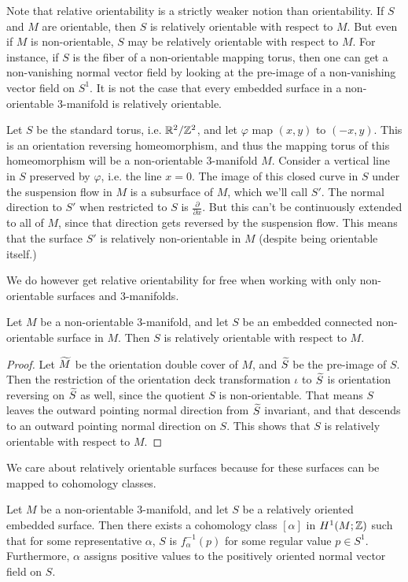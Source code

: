 Note that relative orientability is a strictly weaker notion than orientability. If $S$ and $M$ are
orientable, then $S$ is relatively orientable with respect to $M$. But even if $M$ is
non-orientable, $S$ may be relatively orientable with respect to $M$. For instance, if $S$ is
the fiber of a non-orientable mapping torus, then one can get a non-vanishing normal vector field
by looking at the pre-image of a non-vanishing vector field on $S^1$.
It is not the case that every embedded surface in a non-orientable $3$-manifold is relatively orientable.
\begin{example}
  Let $S$ be the standard torus, i.e. $\mathbb{R}^2/\mathbb{Z}^2$, and let $\varphi$ map $(x,y)$ to $(-x, y)$. This is an
  orientation reversing homeomorphism, and thus the mapping torus of this homeomorphism will be a
  non-orientable $3$-manifold $M$. Consider a vertical line in $S$ preserved by $\varphi$, i.e. the line
  $x = 0$. The image of this closed curve in $S$ under the suspension flow in $M$ is a subsurface of $M$,
  which we'll call $S'$. The normal direction to $S'$ when restricted to $S$ is $\frac{\partial}{\partial x}$. But
  this can't be continuously extended to all of $M$, since that direction gets reversed by the suspension flow.
  This means that the surface $S'$ is relatively non-orientable in $M$ (despite being orientable itself.)
\end{example}
We do however get relative orientability for free when working with only non-orientable surfaces and $3$-manifolds.
\begin{prop}
  \label{prop:relative-orientability}
  Let $M$ be a non-orientable $3$-manifold, and let $S$ be an embedded connected non-orientable surface in $M$.
  Then $S$ is relatively orientable with respect to $M$.
\end{prop}
\begin{proof}
  Let $\widetilde{M}$ be the orientation double cover of $M$, and $\widetilde{S}$ be the pre-image of $S$. Then the
  restriction of the orientation deck transformation $\iota$ to $\widetilde{S}$ is orientation reversing on $\widetilde{S}$
  as well, since the quotient $S$ is non-orientable. That means $S$ leaves the outward pointing normal
  direction from $\widetilde{S}$ invariant, and that descends to an outward pointing normal direction on $S$. This
  shows that $S$ is relatively orientable with respect to $M$.
\end{proof}

We care about relatively orientable surfaces because for these surfaces can be mapped to cohomology classes.
\begin{thm}
  \label{thm:Poincare-duality}
  Let $M$ be a non-orientable $3$-manifold, and let $S$ be a relatively oriented embedded
  surface. Then there exists a cohomology class $[\alpha]$ in $H^1(M; \mathbb{Z})$ such that for some
  representative $\alpha$, $S$ is $f_{\alpha}^{-1}(p)$ for some regular value $p \in
  S^1$. Furthermore, $\alpha$ assigns positive values to the positively oriented normal vector
  field on $S$.
\end{thm}

